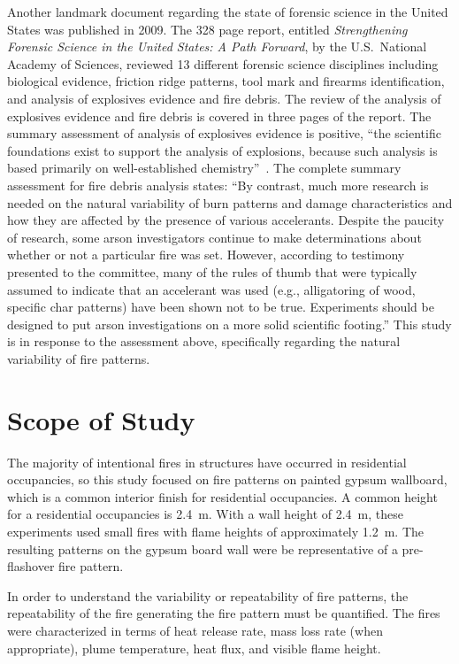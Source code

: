 \documentclass[twoside]{uocthesis}
\begin{document}
Another landmark document regarding the state of forensic science in the United States was published in 2009.  The 328 page report, entitled {\em Strengthening Forensic Science in the United States: A Path Forward}, by the U.S.~National Academy of Sciences, reviewed 13 different forensic science disciplines including biological evidence, friction ridge patterns, tool mark and firearms identification, and analysis of explosives evidence and fire debris.  The review of the analysis of explosives evidence and fire debris is covered in three pages of the report.  The summary assessment of analysis of explosives evidence is positive, ``the scientific foundations exist to support the analysis of explosions, because such analysis is based primarily on well-established chemistry''~\cite{Forensic:2009}.  The complete summary assessment for fire debris analysis states: ``By contrast, much more research is needed on the natural variability of burn patterns and damage characteristics and how they are affected by the presence of various accelerants.  Despite the paucity of research, some arson investigators continue to make determinations about whether or not a particular fire was set.  However, according to testimony presented to the committee, many of the rules of thumb that were typically assumed to indicate that an accelerant was used (e.g., alligatoring of wood, specific char patterns) have been shown not to be true.  Experiments should be designed to put arson investigations on a more solid scientific footing.''
This study is in response to the assessment above, specifically regarding the natural variability of fire patterns.

\section{Scope of Study}

The majority of intentional fires in structures have occurred in residential occupancies, so this study focused on fire patterns on painted gypsum wallboard, which is a common interior finish for residential occupancies.  A common height for a residential occupancies is 2.4~m.  With a wall height of 2.4~m, these experiments used small fires with flame heights of approximately 1.2~m.  The resulting patterns on the gypsum board wall were be representative of a pre-flashover fire pattern.

In order to understand the variability or repeatability of fire patterns, the repeatability of the fire generating the fire pattern must be quantified.  The fires were characterized in terms of heat release rate, mass loss rate (when appropriate), plume temperature, heat flux, and visible flame height.
\end{document}

